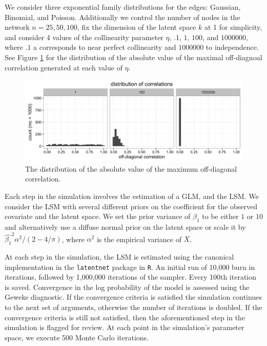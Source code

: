 \documentclass[12pt]{article}
\begin{document}
We consider three exponential family distributions for the edges: Gaussian, Binomial, and Poisson. Additionally we control the number of nodes in the network $n = 25, 50, 100$, fix the dimension of the latent space $k$ at 1 for simplicity, and consider 4 values of the collinearity parameter $\eta$, $.1$, $1$, $100$, and $1000000$, where $.1$ a corresponds to near perfect collinearity and $1000000$ to independence. See Figure \ref{fig:vine} for the distribution of the absolute value of the maximal off-diagnoal correlation generated at each value of $\eta$.

\begin{figure}
\includegraphics[width=\textwidth]{max_r_vine.png}
\caption{The distribution of the absolute value of the maximum off-diagonal correlation. \label{fig:vine}}
\end{figure}

Each step in the simulation involves the estimation of a GLM, and the LSM. We consider the LSM with several different priors on the coefficient for the observed covariate and the latent space. We set the prior variance of $\beta_1$ to be either $1$ or $10$ and alternatively use a diffuse normal prior on the latent space or scale it by $\hat{\beta_1}^2\alpha^2/(2-4/\pi)$, where $\alpha^2$ is the empirical variance of $X$.

At each step in the simulation, the LSM is estimated using the canonical implementation in the \texttt{latentnet} package in \texttt{R}. An initial run of 10,000 burn in iterations, followed by 1,000,000 iterations of the sampler. Every 100th iteration is saved. Convergence in the log probability of the model is assessed using the Geweke diagnostic. If the convergence criteria is satisfied the simulation continues to the next set of arguments, otherwise the number of iterations is doubled. If the convergence criteria is still not satisfied, then the aforementioned step in the simulation is flagged for review. At each point in the simulation's parameter space, we execute 500 Monte Carlo iterations.
\end{document}
